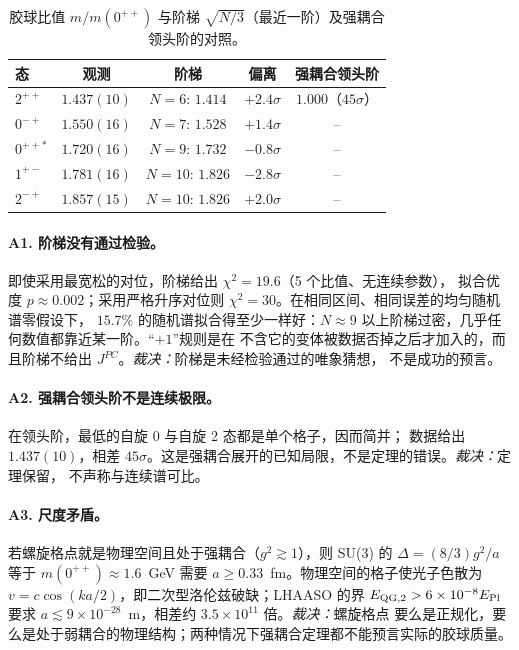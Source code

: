 \documentclass[aps,prd,preprint,superscriptaddress,amsmath,amssymb]{revtex4-2}
\begin{document}
\begin{table}[h]
\caption{\label{tab:audit} 胶球比值 $m/m(0^{++})$ 与阶梯 $\sqrt{N/3}$（最近一阶）及强耦合领头阶的对照。}
\begin{ruledtabular}
\begin{tabular}{lcccc}
态 & 观测 & 阶梯 & 偏离 & 强耦合领头阶\\
\hline
$2^{++}$ & $1.437(10)$ & $N=6$: $1.414$ & $+2.4\sigma$ & $1.000$（$45\sigma$）\\
$0^{-+}$ & $1.550(16)$ & $N=7$: $1.528$ & $+1.4\sigma$ & --\\
$0^{++*}$ & $1.720(16)$ & $N=9$: $1.732$ & $-0.8\sigma$ & --\\
$1^{+-}$ & $1.781(16)$ & $N=10$: $1.826$ & $-2.8\sigma$ & --\\
$2^{-+}$ & $1.857(15)$ & $N=10$: $1.826$ & $+2.0\sigma$ & --\\
\end{tabular}
\end{ruledtabular}
\end{table}

\paragraph{A1. 阶梯没有通过检验。}即使采用最宽松的对位，阶梯给出 $\chi^2=19.6$（5 个比值、无连续参数），
拟合优度 $p\approx0.002$；采用严格升序对位则 $\chi^2=30$。在相同区间、相同误差的均匀随机谱零假设下，
$15.7\%$ 的随机谱拟合得至少一样好：$N\approx9$ 以上阶梯过密，几乎任何数值都靠近某一阶。``$+1$''规则是在
不含它的变体被数据否掉之后才加入的，而且阶梯不给出 $J^{PC}$。\emph{裁决：}阶梯是未经检验通过的唯象猜想，
不是成功的预言。

\paragraph{A2. 强耦合领头阶不是连续极限。}在领头阶，最低的自旋 0 与自旋 2 态都是单个格子，因而简并；
数据给出 $1.437(10)$，相差 $45\sigma$。这是强耦合展开的已知局限，不是定理的错误。\emph{裁决：}定理保留，
不声称与连续谱可比。

\paragraph{A3. 尺度矛盾。}若螺旋格点就是物理空间且处于强耦合（$g^2\gtrsim1$），则 SU(3) 的
$\Delta=(8/3)g^2/a$ 等于 $m(0^{++})\approx1.6$~GeV 需要 $a\ge0.33$~fm。物理空间的格子使光子色散为
$v=c\cos(ka/2)$，即二次型洛伦兹破缺；LHAASO 的界 $E_{\rm QG,2}>6\times10^{-8}E_{\rm Pl}$
\cite{lhaaso2024liv} 要求 $a\lesssim9\times10^{-28}$~m，相差约 $3.5\times10^{11}$ 倍。\emph{裁决：}螺旋格点
要么是正规化，要么是处于弱耦合的物理结构；两种情况下强耦合定理都不能预言实际的胶球质量。
\end{document}
